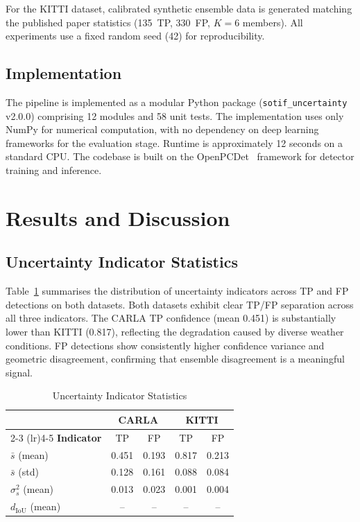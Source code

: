 \documentclass[conference]{IEEEtran}
\begin{document}
For the KITTI dataset, calibrated synthetic ensemble data is generated matching the published paper statistics (135~TP, 330~FP, $K{=}6$ members). All experiments use a fixed random seed (42) for reproducibility.

\subsection{Implementation}

The pipeline is implemented as a modular Python package (\texttt{sotif\_uncertainty} v2.0.0) comprising 12 modules and 58 unit tests. The implementation uses only NumPy for numerical computation, with no dependency on deep learning frameworks for the evaluation stage. Runtime is approximately 12 seconds on a standard CPU. The codebase is built on the OpenPCDet~\cite{openpcdet} framework for detector training and inference.


\section{Results and Discussion}

\subsection{Uncertainty Indicator Statistics}

Table~\ref{tab:indicator_stats} summarises the distribution of uncertainty indicators across TP and FP detections on both datasets. Both datasets exhibit clear TP/FP separation across all three indicators. The CARLA TP confidence (mean 0.451) is substantially lower than KITTI (0.817), reflecting the degradation caused by diverse weather conditions. FP detections show consistently higher confidence variance and geometric disagreement, confirming that ensemble disagreement is a meaningful signal.

\begin{table}[t]
\caption{Uncertainty Indicator Statistics}
\label{tab:indicator_stats}
\centering
\small
\begin{tabular}{lcccc}
\toprule
& \multicolumn{2}{c}{\textbf{CARLA}} & \multicolumn{2}{c}{\textbf{KITTI}} \\
\cmidrule(lr){2-3} \cmidrule(lr){4-5}
\textbf{Indicator} & TP & FP & TP & FP \\
\midrule
$\bar{s}$ (mean) & 0.451 & 0.193 & 0.817 & 0.213 \\
$\bar{s}$ (std) & 0.128 & 0.161 & 0.088 & 0.084 \\
$\sigma^2_s$ (mean) & 0.013 & 0.023 & 0.001 & 0.004 \\
$d_\text{IoU}$ (mean) & -- & -- & -- & -- \\
\bottomrule
\end{tabular}
\end{table}
\end{document}
